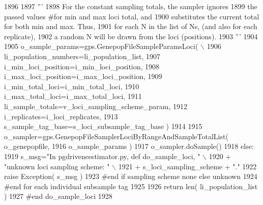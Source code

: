 \begin{DoxyCode}
1896         
1897             \textcolor{stringliteral}{'''}
1898 \textcolor{stringliteral}{            For the constant sampling totals, the sampler ignores }
1899 \textcolor{stringliteral}{            the passed values #for min and max loci total, and }
1900 \textcolor{stringliteral}{            substitutes the current total for both min and max. Thus,}
1901 \textcolor{stringliteral}{            for each N in the list of Ns, (and also for each replicate),  }
1902 \textcolor{stringliteral}{            a random N will be drawn from the loci (positions). }
1903 \textcolor{stringliteral}{            '''}
1904 
1905             o\_sample\_params=gps.GenepopFileSampleParamsLoci( \(\backslash\)
1906                                         li\_population\_numbers=li\_population\_list,
1907                                         i\_min\_loci\_position=i\_min\_loci\_position,
1908                                         i\_max\_loci\_position=i\_max\_loci\_position,
1909                                         i\_min\_total\_loci=i\_min\_total\_loci,
1910                                         i\_max\_total\_loci=i\_max\_total\_loci,
1911                                         li\_sample\_totals=v\_loci\_sampling\_scheme\_param,
1912                                         i\_replicates=i\_loci\_replicates,
1913                                         s\_sample\_tag\_base=s\_loci\_subsample\_tag\_base )
1914 
1915             o\_sampler=gps.GenepopFileSamplerLociByRangeAndSampleTotalList( o\_genepopfile,
1916                                                                             o\_sample\_params )
1917             o\_sampler.doSample()
1918         \textcolor{keywordflow}{else}:
1919             s\_msg=\textcolor{stringliteral}{"In pgdriveneestimator.py, def do\_sample\_loci, "} \(\backslash\)
1920                         + \textcolor{stringliteral}{"unknown loci sampling scheme: "} \(\backslash\)
1921                         + s\_loci\_sampling\_scheme + \textcolor{stringliteral}{"."}
1922             \textcolor{keywordflow}{raise} Exception( s\_msg )
1923         \textcolor{comment}{#end if sampling scheme none else unknown}
1924     \textcolor{comment}{#end for each individual subsample tag}
1925 
1926     \textcolor{keywordflow}{return} len( li\_population\_list )
1927 \textcolor{comment}{#end do\_sample\_loci}
1928 
\end{DoxyCode}
